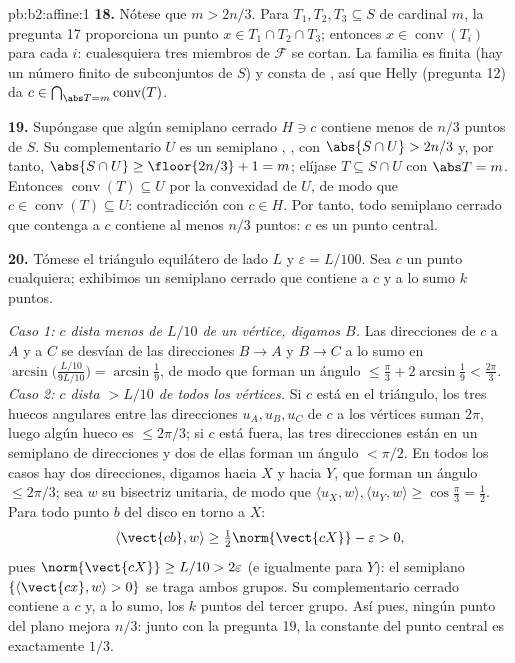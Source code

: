 \begin{solution}{pb:b2:affine:1}
\textbf{18.} Nótese que $m > 2n/3$. Para $T_1, T_2, T_3 \subseteq S$
de cardinal $m$, la pregunta 17 proporciona un punto $x \in T_1 \cap
T_2 \cap T_3$; entonces $x \in \operatorname{conv}(T_i)$ para cada
$i$: cualesquiera tres miembros de $\mathcal F$ se cortan. La familia
es finita (hay un número finito de subconjuntos de $S$) y consta de
, así que Helly (pregunta 12) da $c \in
\bigcap_{\abs T = m}\operatorname{conv}(T)$.

\textbf{19.} Supóngase que algún semiplano cerrado $H \ni c$ contiene
menos de $n/3$ puntos de $S$. Su complementario $U$ es un semiplano
, , con $\abs{S \cap U} > 2n/3$ y, por tanto, $\abs{S
\cap U} \geq \floor{2n/3} + 1 = m$; elíjase $T \subseteq S \cap U$
con $\abs T = m$. Entonces $\operatorname{conv}(T) \subseteq U$ por
la convexidad de $U$, de modo que $c \in \operatorname{conv}(T)
\subseteq U$: contradicción con $c \in H$. Por tanto, todo semiplano
cerrado que contenga a $c$ contiene al menos $n/3$ puntos: $c$ es un
punto central.

\textbf{20.} Tómese el triángulo equilátero de lado $L$ y
$\varepsilon = L/100$. Sea $c$ un punto cualquiera; exhibimos un
semiplano cerrado que contiene a $c$ y a lo sumo $k$ puntos.

\emph{Caso 1: $c$ dista menos de $L/10$ de un vértice, digamos $B$.}
Las direcciones de $c$ a $A$ y a $C$ se desvían de las direcciones $B
\to A$ y $B \to C$ a lo sumo en
$\arcsin\bigl(\tfrac{L/10}{9L/10}\bigr) = \arcsin\tfrac19$, de modo
que forman un ángulo $\leq \tfrac\pi3 + 2\arcsin\tfrac19 <
\tfrac{2\pi}3$. \emph{Caso 2: $c$ dista $> L/10$ de todos los
vértices.} Si $c$ está en el triángulo, los tres huecos angulares
entre las direcciones $u_A, u_B, u_C$ de $c$ a los vértices suman
$2\pi$, luego algún hueco es $\leq 2\pi/3$; si $c$ está fuera, las
tres direcciones están en un semiplano  de direcciones y dos
de ellas forman un ángulo $< \pi/2$. En todos los casos hay dos
direcciones, digamos hacia $X$ y hacia $Y$, que forman un ángulo
$\leq 2\pi/3$; sea $w$ su bisectriz unitaria, de modo que $\langle
u_X, w\rangle, \langle u_Y, w\rangle \geq \cos\tfrac\pi3 =
\tfrac12$. Para todo punto $b$ del disco en torno a $X$:
\[
\langle \vect{cb}, w\rangle \geq
\tfrac12\norm{\vect{cX}} - \varepsilon > 0,
\]
pues $\norm{\vect{cX}} \geq L/10 > 2\varepsilon$ (e igualmente para
$Y$): el semiplano  $\{\langle \vect{cx}, w\rangle > 0\}$ se
traga ambos grupos. Su complementario cerrado contiene a $c$ y, a lo
sumo, los $k$ puntos del tercer grupo. Así pues, ningún punto del
plano mejora $n/3$: junto con la pregunta 19, la constante del punto
central es exactamente $1/3$.


\end{solution}
